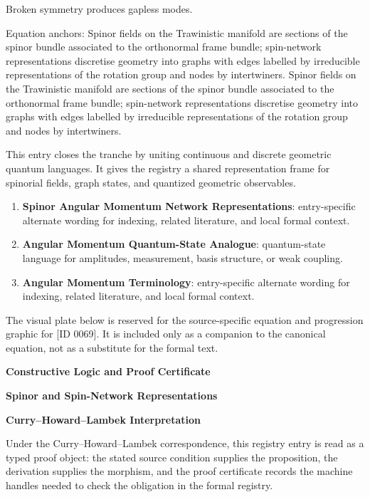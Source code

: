 Broken symmetry produces gapless modes.

Equation anchors: Spinor fields on the Trawinistic manifold are sections of the spinor bundle associated to the orthonormal frame bundle; spin-network representations discretise geometry into graphs with edges labelled by irreducible representations of the rotation group and nodes by intertwiners. Spinor fields on the Trawinistic manifold are sections of the spinor bundle associated to the orthonormal frame bundle; spin-network representations discretise geometry into graphs with edges labelled by irreducible representations of the rotation group and nodes by intertwiners.

This entry closes the tranche by uniting continuous and discrete geometric quantum languages. It gives the registry a shared representation frame for spinorial fields, graph states, and quantized geometric observables.
\endgroup

\begingroup\footnotesize\sloppy
\begin{enumerate}[leftmargin=1.35em,itemsep=1pt,topsep=1pt,parsep=0pt]
\item \textbf{Spinor Angular Momentum Network Representations}: entry-specific alternate wording for indexing, related literature, and local formal context.
\item \textbf{Angular Momentum Quantum-State Analogue}: quantum-state language for amplitudes, measurement, basis structure, or weak coupling.
\item \textbf{Angular Momentum Terminology}: entry-specific alternate wording for indexing, related literature, and local formal context.
\end{enumerate}
\endgroup

\begingroup\footnotesize\sloppy
The visual plate below is reserved for the source-specific equation and progression graphic for [ID 0069]. It is included only as a companion to the canonical equation, not as a substitute for the formal text.
\par\endgroup
\ifTZPDarkEdition
{}
\fi

\clearpage
\begingroup\tzpsupportsetup
\noindent\textbf{\fontsize{10.8pt}{12.8pt}\selectfont [ID 0069] Constructive Logic and Proof Certificate}\par
\noindent\textbf{\fontsize{10pt}{12pt}\selectfont Spinor and Spin-Network Representations}\par
\vspace{0.45em}
\begingroup
\footnotesize
\setlength{\parskip}{0.22em}
\setlength{\parindent}{0pt}
\noindent\textbf{Curry--Howard--Lambek Interpretation}\par
Under the Curry--Howard--Lambek correspondence, this registry entry is read as a typed proof
object: the stated source condition supplies the proposition, the derivation supplies the
morphism, and the proof certificate records the machine handles needed to check the obligation
in the formal registry.

